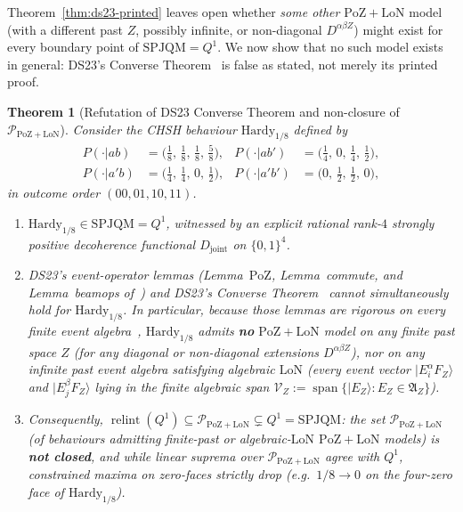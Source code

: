 \documentclass[11pt,a4paper]{article}
\newtheorem{theorem}{Theorem}[section]
\theoremstyle{definition}
\theoremstyle{remark}
\newcommand{\EA}{\mathfrak{A}}
\newcommand{\SPJQM}{\mathrm{SPJQM}}
\newcommand{\Qone}{Q^{1}}
\newcommand{\PoZ}{\mathrm{PoZ}}
\newcommand{\LoN}{\mathrm{LoN}}
\newcommand{\PPoZ}{\mathcal{P}_{\PoZ+\LoN}}
\newcommand{\ket}[1]{|#1\rangle}
\newcommand{\relint}{\operatorname{relint}}
\begin{document}
Theorem~\ref{thm:ds23-printed} leaves open whether \emph{some other} $\PoZ+\LoN$ model (with a different past $Z$, possibly infinite, or non-diagonal $D^{\alpha\beta Z}$) might exist for every boundary point of $\SPJQM = \Qone$. We now show that no such model exists in general: DS23's Converse Theorem~\cite[L1267]{DowkerSorkin2023} is false as stated, not merely its printed proof.

\begin{theorem}[Refutation of DS23 Converse Theorem and non-closure of $\PPoZ$]
\label{thm:ds23-refutation}
Consider the CHSH behaviour $\mathrm{Hardy}_{1/8}$ defined by
\begin{equation}\label{eq:hardy18}
\begin{aligned}
P(\cdot|ab) &= \bigl(\tfrac{1}{8},\, \tfrac{1}{8},\, \tfrac{1}{8},\, \tfrac{5}{8}\bigr), &
P(\cdot|ab') &= \bigl(\tfrac{1}{4},\, 0,\, \tfrac{1}{4},\, \tfrac{1}{2}\bigr), \\
P(\cdot|a'b) &= \bigl(\tfrac{1}{4},\, \tfrac{1}{4},\, 0,\, \tfrac{1}{2}\bigr), &
P(\cdot|a'b') &= \bigl(0,\, \tfrac{1}{2},\, \tfrac{1}{2},\, 0\bigr),
\end{aligned}
\end{equation}
in outcome order $(00, 01, 10, 11)$.
\begin{enumerate}[label=(\alph*),nosep]
\item $\mathrm{Hardy}_{1/8} \in \SPJQM = \Qone$, witnessed by an explicit rational rank-$4$ strongly positive decoherence functional $D_{\mathrm{joint}}$ on $\{0,1\}^4$.
\item DS23's event-operator lemmas (\emph{Lemma~$\PoZ$}, \emph{Lemma~commute}, and \emph{Lemma~beamops} of~\cite{DowkerSorkin2023}) and DS23's Converse Theorem~\cite[L1267]{DowkerSorkin2023} cannot simultaneously hold for $\mathrm{Hardy}_{1/8}$. In particular, because those lemmas are rigorous on every finite event algebra~\cite[fn., L798]{DowkerSorkin2023}, $\mathrm{Hardy}_{1/8}$ admits \textbf{no} $\PoZ+\LoN$ model on any finite past space $Z$ (for any diagonal or non-diagonal extensions $D^{\alpha\beta Z}$), nor on any infinite past event algebra satisfying algebraic $\LoN$ (every event vector $\ket{E^\alpha_i F_Z}$ and $\ket{E^\beta_j F_Z}$ lying in the finite algebraic span $\mathcal{V}_Z := \operatorname{span}\{\ket{E_Z} : E_Z \in \EA_Z\}$).
\item Consequently, $\relint(\Qone) \subseteq \PPoZ \subsetneq \Qone = \SPJQM$: the set $\PPoZ$ (of behaviours admitting finite-past or algebraic-$\LoN$ $\PoZ+\LoN$ models) is \textbf{not closed}, and while linear suprema over $\PPoZ$ agree with $\Qone$, constrained maxima on zero-faces strictly drop (e.g.\ $1/8 \to 0$ on the four-zero face of $\mathrm{Hardy}_{1/8}$).
\end{enumerate}
\end{theorem}
\end{document}
